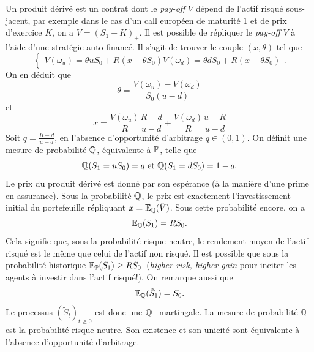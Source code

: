 Un produit dérivé est un contrat dont le \textit{pay-off} $V$ dépend de l'actif risqué sous-jacent, par exemple dans le cas d'un call européen de maturité $1$ et de prix d'exercice $K$, on a $V = (S_1-K)_+$. Il est possible de répliquer le \textit{pay-off} $V$ à l'aide d'une stratégie auto-financé. Il s'agit de trouver le couple $(x,\theta)$ tel que 
$$
\begin{cases}
V(\omega_u) = \theta u S_0+R(x-\theta S_0)
V(\omega_d) = \theta d S_0+R(x-\theta S_0)
\end{cases}.
$$
On en déduit que 
$$
\theta = \frac{V(\omega_u)-V(\omega_d)}{S_0(u-d)}
$$
et 
\begin{equation}\label{eq:valeur_initiale}
x=\frac{V(\omega_u)}{R}\frac{R-d}{u-d} + \frac{V(\omega_d)}{R}\frac{u-R}{u-d}
\end{equation}
Soit $q =\frac{R-d}{u-d}$, en l'absence d'opportunité d'arbitrage $q\in(0,1)$. On définit une mesure de probabilité $\mathbb{Q}$, équivalente à $\mathbb{P}$, telle que 
$$
\mathbb{Q}(S_1 = uS_0) = q\text{ et }\mathbb{Q}(S_1 = dS_0) = 1-q.
$$ 
Le prix du produit dérivé est donné par son espérance (à la manière d'une prime en assurance). Sous la probabilité $\mathbb{Q}$, le prix est exactement l'investissement initial du portefeuille répliquant $x = \mathbb{E}_{\mathbb{Q}}(\tilde V)$. Sous cette probabilité encore, on a 
$$
\mathbb{E}_{\mathbb{Q}}(S_1) = RS_0.
$$
Cela signifie que, sous la probabilité risque neutre, le rendement moyen de l'actif risqué est le même que celui de l'actif non risqué. Il est possible que sous la probabilité historique $\mathbb{E}_{\mathbb{P}}(S_1) \geq RS_0$\ (\textit{higher risk, higher gain} pour inciter les agents à investir dans l'actif risqué!). 
On remarque aussi que
$$\mathbb{E}_{\mathbb{Q}}(\tilde{S}_1) = S_0.
$$ 
Le processus $(\tilde{S}_t)_{t\geq0}$ est donc une $\mathbb{Q}-$martingale. La mesure de probabilité $\mathbb{Q}$ est la probabilité risque neutre. Son existence et son unicité sont équivalente à l'absence d'opportunité d'arbitrage. 
